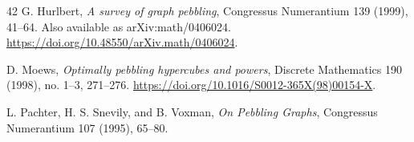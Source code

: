 \documentclass[11pt]{article}
\theoremstyle{plain}
\theoremstyle{definition}
\begin{document}
\begin{thebibliography}{42}
G. Hurlbert,
\emph{A survey of graph pebbling},
Congressus Numerantium 139 (1999), 41--64.
Also available as arXiv:math/0406024.
\url{https://doi.org/10.48550/arXiv.math/0406024}.

D. Moews,
\emph{Optimally pebbling hypercubes and powers},
Discrete Mathematics 190 (1998), no. 1--3, 271--276.
\url{https://doi.org/10.1016/S0012-365X(98)00154-X}.

L. Pachter, H. S. Snevily, and B. Voxman,
\emph{On Pebbling Graphs},
Congressus Numerantium 107 (1995), 65--80.

\end{thebibliography}
\end{document}
